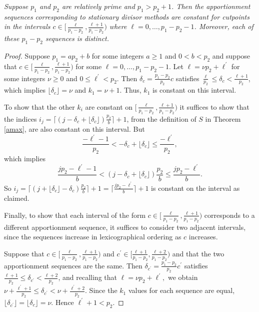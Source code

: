 \documentclass[pdflatex,sn-mathphys-num]{sn-jnl}
\theoremstyle{thmstyleone}%
\theoremstyle{thmstyletwo}%
\theoremstyle{thmstylethree}%
\begin{document}
 {\it 
Suppose $p_1$ and $p_2$  are relatively prime and $p_1>p_2+1$. Then the apportionment sequences  corresponding to stationary divisor methods are constant for  cutpoints in  the intervals  $c \in  [\frac{\ell}{p_1-p_2}, \frac{\ell+1}{p_1-p_2})$ where $\ell= 0, \ldots, p_{1}-p_2-1$.  Moreover, each of these $p_1-p_2$ sequences is distinct.}

\begin{proof}
 Suppose  $p_1=ap_2+b$ for some integers $a \ge 1$ and $0< b <p_2$ and suppose that $c \in [\frac{\ell}{p_1-p_2}, \frac{\ell+1}{p_1-p_2})$ for some $\ell = 0, \ldots, p_{1}-p_2-1$. Let $\ell = \nu p_2+\ell^\prime$ for some integers $\nu \ge 0$ and $0 \le \ell^\prime< p_2.$
Then $\delta_c = \frac{p_1-p_2}{p_2}c$ satisfies 
$\frac{\ell}{p_2} \le \delta_c <  \frac{\ell+1}{p_2}$, which implies  $\lfloor \delta_c \rfloor = \nu$ and  $k_1= \nu +1$. Thus, $k_1$ is constant on this interval. 

To show that the other $k_i$ are  constant on  $[\frac{\ell}{p_1-p_2}, \frac{\ell+1}{p_1-p_2})$ it suffices to show that the indices $i_j =  \lceil (j-\delta_c+ \lfloor \delta_c \rfloor)\frac{p_2}{b} \rceil + 1$, from the definition of $S$ in Theorem \ref{amax}, are also constant on this interval. But  
$$\frac{-\ell^\prime-1}{p_2}   < -\delta_c+\lfloor \delta_c \rfloor \le \frac{-\ell^\prime}{p_2},$$
which implies $$\frac{jp_2-\ell^\prime-1}{b} <  (j-\delta_c+\lfloor \delta_c \rfloor)\frac{p_2}{b} \le   \frac{jp_2-\ell^\prime}{b}.$$
So   $i_j =  \lceil (j+\lfloor \delta_c \rfloor -\delta_c)\frac{p_2}{b} \rceil+1 = \lceil  \frac{jp_2-\ell^\prime}{b} \rceil+1$ is constant on the interval as claimed.

Finally, to show that each interval of the form $c \in [\frac{\ell}{p_1-p_2}, \frac{\ell+1}{p_1-p_2})$ corresponds to a different apportionment sequence, it suffices to consider two adjacent intervals, since the sequences increase in lexicographical ordering as $c$ increases. 

Suppose that   $c \in  [\frac{\ell}{p_1-p_2}, \frac{\ell+1}{p_1-p_2})$ and $c^\prime \in  [\frac{\ell+1}{p_1-p_2}, \frac{\ell+2}{p_1-p_2})$ and that the two apportionment sequences are the same. Then
$\delta_{c^\prime} = \frac{p_1-p_2}{p_2}c^\prime$ satisfies $ \frac{\ell+1}{p_2} \le \delta_{c^\prime} <  \frac{\ell+2}{p_2}$, and recalling  that $\ell = \nu p_2+\ell^\prime,$ we obtain 
$\nu+\frac{\ell^\prime+1}{p_2}  \le \delta_{c^\prime} < \nu+\frac{\ell^\prime+2}{p_2}.$
Since the $k_1$ values for each sequence are equal, $\lfloor \delta_{c^\prime} \rfloor = \lfloor \delta_{c} \rfloor   = \nu$. Hence $\ell^\prime+1 < p_2$.


\end{proof}
\end{document}
